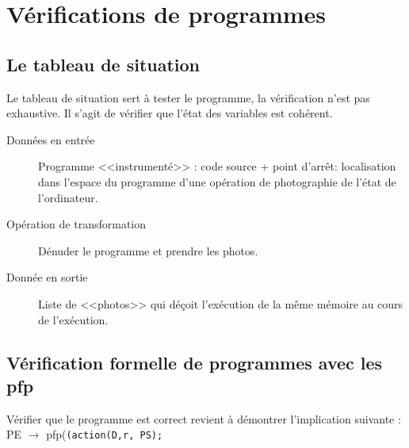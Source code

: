 \chapter{Vérifications de programmes}
\section{Le tableau de situation}\label{tableauSituation}
		Le tableau de situation sert à tester le programme, la vérification n'est pas exhaustive. Il s'agit de vérifier que l'état des variables est cohérent.
			\begin{description}
				\item[Données en entrée] Programme <<instrumenté>> : code source + point d'arrêt: 
					localisation dans l'espace du programme d'une opération de photographie de l'état de l'ordinateur.
				\item[Opération de transformation] Dénuder le programme et prendre les photos. 
				\item[Donnée en sortie] Liste de <<photos>> qui déçoit l'exécution de la même mémoire au cours de l'exécution.
			\end{description}
\section{Vérification formelle de programmes avec les pfp}\label{pfp}
	Vérifier que le programme est correct revient à démontrer l'implication suivante :\\ PE $\rightarrow$ pfp(\texttt{(action(D,r, PS);}

